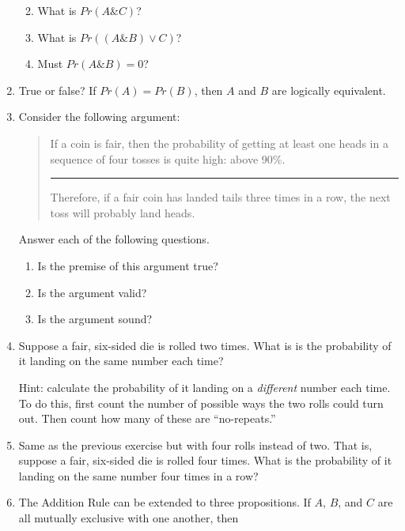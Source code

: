 \documentclass[justified]{tufte-book}
\providecommand{\tightlist}{%
  \setlength{\itemsep}{0pt}\setlength{\parskip}{0pt}}
\renewcommand{\wedge}{\mathbin{\&}}
\newcommand{\p}{Pr}
\newenvironment{argument}{\begin{quote}\normalsize}{\end{quote}}
\theoremstyle{definition}
\theoremstyle{definition}
\theoremstyle{definition}
\theoremstyle{remark}
\begin{document}
\begin{enumerate}
  \begin{enumerate}
  \def\labelenumii{\alph{enumii}.}
  \tightlist
  \item
    What is \(\p(A \wedge C)\)?
  \item
    What is \(\p((A \wedge B) \vee C)\)?
  \item
    Must \(\p(A \wedge B) = 0\)?
  \end{enumerate}
\item
  True or false? If \(\p(A)=\p(B)\), then \(A\) and \(B\) are logically equivalent.
\item
  Consider the following argument:

  \begin{argument}
   If a coin is fair, then the probability of getting at least one heads in
   a sequence of four tosses is quite high: above 90\%.

   \begin{center}\rule{0.5\linewidth}{\linethickness}\end{center}

   Therefore, if a fair coin has landed tails three times in a row, the
   next toss will probably land heads.
   \end{argument}

  Answer each of the following questions.

  \begin{enumerate}
  \def\labelenumii{\alph{enumii}.}
  \tightlist
  \item
    Is the premise of this argument true?
  \item
    Is the argument valid?
  \item
    Is the argument sound?
  \end{enumerate}
\item
  Suppose a fair, six-sided die is rolled two times. What is is the probability of it landing on the same number each time?

  Hint: calculate the probability of it landing on a \emph{different} number each time. To do this, first count the number of possible ways the two rolls could turn out. Then count how many of these are ``no-repeats.''
\item
  Same as the previous exercise but with four rolls instead of two. That is, suppose a fair, six-sided die is rolled four times. What is the probability of it landing on the same number four times in a row?
\item
  The Addition Rule can be extended to three propositions. If \(A\), \(B\), and \(C\) are all mutually exclusive with one another, then


\end{enumerate}
\end{document}
